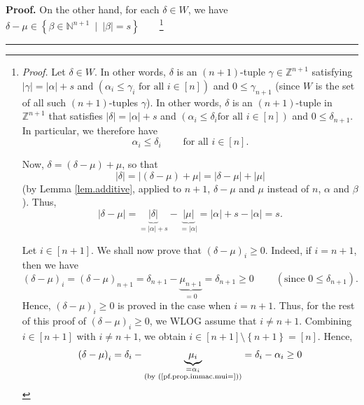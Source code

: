 \documentclass[numbers=enddot,12pt,final,onecolumn,notitlepage,english]{scrartcl}%
\theoremstyle{definition}
\newenvironment{proof}[1][Proof]{\noindent\textbf{#1.} }{\ \rule{0.5em}{0.5em}}
\newenvironment{verlong}{}{}
\begin{document}
\begin{proof}
\begin{verlong}
On the other hand, for each $\delta\in W$, we have $\delta-\mu\in\left\{
\beta\in\mathbb{N}^{n+1}\ \mid\ \left\vert \beta\right\vert =s\right\}
$\ \ \ \ \footnote{\textit{Proof.} Let $\delta\in W$. In other words, $\delta$
is an $\left(  n+1\right)  $-tuple $\gamma\in\mathbb{Z}^{n+1}$ satisfying
$\left\vert \gamma\right\vert =\left\vert \alpha\right\vert +s$ and $\left(
\alpha_{i}\leq\gamma_{i}\text{ for all }i\in\left[  n\right]  \right)  $ and
$0\leq\gamma_{n+1}$ (since $W$ is the set of all such $\left(  n+1\right)
$-tuples $\gamma$). In other words, $\delta$ is an $\left(  n+1\right)
$-tuple in $\mathbb{Z}^{n+1}$ that satisfies $\left\vert \delta\right\vert
=\left\vert \alpha\right\vert +s$ and $\left(  \alpha_{i}\leq\delta_{i}\text{
for all }i\in\left[  n\right]  \right)  $ and $0\leq\delta_{n+1}$. In
particular, we therefore have%
\begin{equation}
\alpha_{i}\leq\delta_{i}\ \ \ \ \ \ \ \ \ \ \text{for all }i\in\left[
n\right]  . \label{pf.prop.immac.fn5.pf.1}%
\end{equation}
\par
Now, $\delta=\left(  \delta-\mu\right)  +\mu$, so that%
\[
\left\vert \delta\right\vert =\left\vert \left(  \delta-\mu\right)
+\mu\right\vert =\left\vert \delta-\mu\right\vert +\left\vert \mu\right\vert
\]
(by Lemma \ref{lem.additive}, applied to $n+1$, $\delta-\mu$ and $\mu$ instead
of $n$, $\alpha$ and $\beta$). Thus,%
\[
\left\vert \delta-\mu\right\vert =\underbrace{\left\vert \delta\right\vert
}_{=\left\vert \alpha\right\vert +s}-\underbrace{\left\vert \mu\right\vert
}_{=\left\vert \alpha\right\vert }=\left\vert \alpha\right\vert +s-\left\vert
\alpha\right\vert =s.
\]
\par
Let $i\in\left[  n+1\right]  $. We shall now prove that $\left(  \delta
-\mu\right)  _{i}\geq0$. Indeed, if $i=n+1$, then we have%
\[
\left(  \delta-\mu\right)  _{i}=\left(  \delta-\mu\right)  _{n+1}=\delta
_{n+1}-\underbrace{\mu_{n+1}}_{=0}=\delta_{n+1}\geq
0\ \ \ \ \ \ \ \ \ \ \left(  \text{since }0\leq\delta_{n+1}\right)  .
\]
Hence, $\left(  \delta-\mu\right)  _{i}\geq0$ is proved in the case when
$i=n+1$. Thus, for the rest of this proof of $\left(  \delta-\mu\right)
_{i}\geq0$, we WLOG assume that $i\neq n+1$. Combining $i\in\left[
n+1\right]  $ with $i\neq n+1$, we obtain $i\in\left[  n+1\right]
\setminus\left\{  n+1\right\}  =\left[  n\right]  $. Hence,%
\[
\left(  \delta-\mu\right)  _{i}=\delta_{i}-\underbrace{\mu_{i}}%
_{\substack{=\alpha_{i}\\\text{(by (\ref{pf.prop.immac.mui=}))}}}=\delta
_{i}-\alpha_{i}\geq0
\]}
\end{verlong}
\end{proof}
\end{document}
